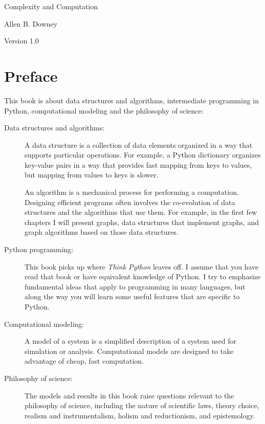 \documentclass[10pt]{book}
\newcommand{\thetitle}{Complexity and Computation}
\newcommand{\theversion}{1.0}
\begin{document}

\begin{htmlonly}


{\Large \thetitle}

{\large Allen B. Downey}

Version \theversion

\setcounter{chapter}{-1}

\end{htmlonly}

\chapter{Preface}

This book is about data structures and algorithms, intermediate
programming in Python, computational modeling and
the philosophy of science:

\begin{description}

\item[Data structures and algorithms:] A data structure is a
  collection of data elements organized in a way that supports
  particular operations.  For example, a Python dictionary organizes
  key-value pairs in a way that provides fast mapping from keys to
  values, but mapping from values to keys is slower.

An algorithm is a mechanical process for performing a computation.
Designing efficient programs often involves the co-evolution of data
structures and the algorithms that use them.  For example, in the
first few chapters I will present graphs, data structures that
implement graphs, and graph algorithms based on those data structures.

\item[Python programming:] This book picks up where {\em Think Python}
  leaves off.  I assume that you have read that book or have
  equivalent knowledge of Python.  I try to emphasize fundamental ideas
  that apply to programming in many languages, but along the way you
  will learn some useful features that are specific to Python.

\item[Computational modeling:] A model of a system is a simplified
  description of a system used for simulation or analysis.
  Computational models are designed to take advantage of cheap, fast
  computation.

\item[Philosophy of science:] The models and results in this book
  raise questions relevant to the philosophy of science,
  including the nature of scientific laws, theory choice, realism and
  instrumentalism, holism and reductionism, and epistemology.

\end{description}
\end{document}

